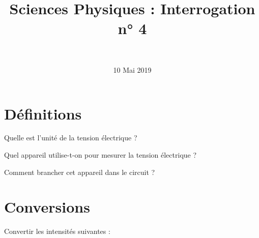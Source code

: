 \documentclass[a4paper,11pt]{exam}
\author{\ }
\date{10 Mai 2019}
\title{Sciences Physiques : Interrogation n° 4}
\begin{document}
%	

	\maketitle
%	
	
	

%

%

\section{Définitions}

\begin{questions}
	\question Quelle est l'unité de la tension électrique ?
	
	\fillwithdottedlines{1.5cm}
	
	\question Quel appareil utilise-t-on pour mesurer la tension électrique ?
	\fillwithdottedlines{1.5cm}
	
	\question Comment brancher cet appareil dans le circuit ?
	\fillwithdottedlines{1.5cm}
\end{questions}

\section{Conversions}

Convertir les intensités suivantes :
\end{document}
